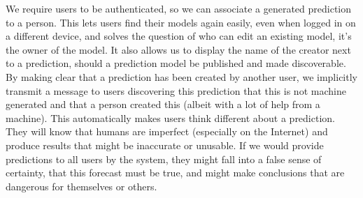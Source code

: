 We require users to be authenticated, so we can associate a generated prediction to a person. This lets users find their models again easily, even when logged in on a different device, and solves the question of who can edit an existing model, it's the owner of the model. It also allows us to display the name of the creator next to a prediction, should a prediction model be published and made discoverable. By making clear that a prediction has been created by another user, we implicitly transmit a message to users discovering this prediction that this is not machine generated and that a person created this (albeit with a lot of help from a machine). This automatically makes users think different about a prediction. They will know that humans are imperfect (especially on the Internet) and produce results that might be inaccurate or unusable. If we would provide predictions to all users by the system, they might fall into a false sense of certainty, that this forecast must be true, and might make conclusions that are dangerous for themselves or others. 
